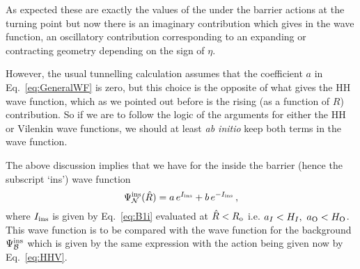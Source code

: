 \documentclass[11pt,a4paper]{article}
\begin{document}
As expected these are exactly the values of the under the barrier actions at the turning point but now there is an imaginary contribution which gives in the wave function, an oscillatory contribution corresponding to an expanding or contracting geometry depending on the sign of $\eta$. 

However, the usual tunnelling calculation assumes that the coefficient $a$  in Eq.~\eqref{eq:GeneralWF} is zero, but this choice is the opposite of what gives the HH wave function, which as we pointed out before is the rising (as a function of $R$) contribution. So if we are to follow the logic of the arguments for either the HH or Vilenkin wave functions, we should at least {\it ab initio} keep both terms in the wave function.

The above discussion implies that we have for the inside the barrier (hence the subscript `ins') wave function
\begin{equation}
\Psi^{{\rm ins}}_{{\cal N}}(\hat{R}) = a \, e^{I_{{\rm ins}}} + b \, e^{-I_{{\rm ins}}} \,,\label{eq:Psiin}
\end{equation}
 where $I_{{\rm ins}}$ is given by Eq.~\eqref{eq:B1i} evaluated at $\hat{R} < R_{\rm o}$ i.e. $a_I<H_I,~a_{\rm O}<H_{\rm O}$. This wave function is to be compared with the wave function for the background $\Psi^{{\rm ins}}_{{\cal B}}$ which is given by the same expression with the action being given now by Eq.~\eqref{eq:HHV}. 
\end{document}
